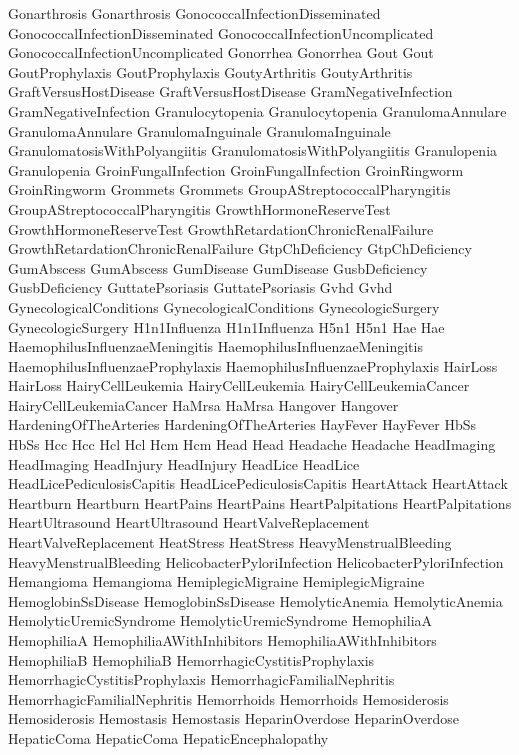 Gonarthrosis
 Gonarthrosis
 GonococcalInfectionDisseminated
 GonococcalInfectionDisseminated
 GonococcalInfectionUncomplicated
 GonococcalInfectionUncomplicated
 Gonorrhea
 Gonorrhea
 Gout
 Gout
 GoutProphylaxis
 GoutProphylaxis
 GoutyArthritis
 GoutyArthritis
 GraftVersusHostDisease
 GraftVersusHostDisease
 GramNegativeInfection
 GramNegativeInfection
 Granulocytopenia
 Granulocytopenia
 GranulomaAnnulare
 GranulomaAnnulare
 GranulomaInguinale
 GranulomaInguinale
 GranulomatosisWithPolyangiitis
 GranulomatosisWithPolyangiitis
 Granulopenia
 Granulopenia
 GroinFungalInfection
 GroinFungalInfection
 GroinRingworm
 GroinRingworm
 Grommets
 Grommets
 GroupAStreptococcalPharyngitis
 GroupAStreptococcalPharyngitis
 GrowthHormoneReserveTest
 GrowthHormoneReserveTest
 GrowthRetardationChronicRenalFailure
 GrowthRetardationChronicRenalFailure
 GtpChDeficiency
 GtpChDeficiency
 GumAbscess
 GumAbscess
 GumDisease
 GumDisease
 GusbDeficiency
 GusbDeficiency
 GuttatePsoriasis
 GuttatePsoriasis
 Gvhd
 Gvhd
 GynecologicalConditions
 GynecologicalConditions
 GynecologicSurgery
 GynecologicSurgery
 H1n1Influenza
 H1n1Influenza
 H5n1
 H5n1
 Hae
 Hae
 HaemophilusInfluenzaeMeningitis
 HaemophilusInfluenzaeMeningitis
 HaemophilusInfluenzaeProphylaxis
 HaemophilusInfluenzaeProphylaxis
 HairLoss
 HairLoss
 HairyCellLeukemia
 HairyCellLeukemia
 HairyCellLeukemiaCancer
 HairyCellLeukemiaCancer
 HaMrsa
 HaMrsa
 Hangover
 Hangover
 HardeningOfTheArteries
 HardeningOfTheArteries
 HayFever
 HayFever
 HbSs
 HbSs
 Hcc
 Hcc
 Hcl
 Hcl
 Hcm
 Hcm
 Head
 Head
 Headache
 Headache
 HeadImaging
 HeadImaging
 HeadInjury
 HeadInjury
 HeadLice
 HeadLice
 HeadLicePediculosisCapitis
 HeadLicePediculosisCapitis
 HeartAttack
 HeartAttack
 Heartburn
 Heartburn
 HeartPains
 HeartPains
 HeartPalpitations
 HeartPalpitations
 HeartUltrasound
 HeartUltrasound
 HeartValveReplacement
 HeartValveReplacement
 HeatStress
 HeatStress
 HeavyMenstrualBleeding
 HeavyMenstrualBleeding
 HelicobacterPyloriInfection
 HelicobacterPyloriInfection
 Hemangioma
 Hemangioma
 HemiplegicMigraine
 HemiplegicMigraine
 HemoglobinSsDisease
 HemoglobinSsDisease
 HemolyticAnemia
 HemolyticAnemia
 HemolyticUremicSyndrome
 HemolyticUremicSyndrome
 HemophiliaA
 HemophiliaA
 HemophiliaAWithInhibitors
 HemophiliaAWithInhibitors
 HemophiliaB
 HemophiliaB
 HemorrhagicCystitisProphylaxis
 HemorrhagicCystitisProphylaxis
 HemorrhagicFamilialNephritis
 HemorrhagicFamilialNephritis
 Hemorrhoids
 Hemorrhoids
 Hemosiderosis
 Hemosiderosis
 Hemostasis
 Hemostasis
 HeparinOverdose
 HeparinOverdose
 HepaticComa
 HepaticComa
 HepaticEncephalopathy
